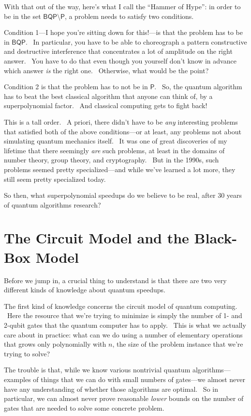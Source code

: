 \documentclass[12pt]{article}
\begin{document}
With that out of the way, here's what I call the ``Hammer of Hype'': in order to be in the set $\mathsf{BQP}\setminus \mathsf{P}$, a problem needs to satisfy two conditions.

Condition 1---I hope you're sitting down for this!---is that the problem has to be in $\mathsf{BQP}$. \ In particular, you have to be able to choreograph a pattern constructive and destructive interference that concentrates a lot of amplitude on the right answer. \ You have to do that even though you yourself don't know in advance which answer \emph{is} the right one. \ Otherwise, what would be the point?

Condition 2 is that the problem has to not be in $\mathsf{P}$. \ So, the quantum algorithm has to beat the best classical algorithm that anyone can think of, by a superpolynomial factor. \ And classical computing gets to fight back!

This is a tall order. \ A priori, there didn't have to be \emph{any} interesting problems that satisfied both of the above conditions---or at least, any problems not about simulating quantum mechanics itself. \ It was one of great discoveries of my lifetime that there seemingly \emph{are} such problems, at least in the domains of number theory, group theory, and cryptography. \ But in the 1990s, such problems seemed pretty specialized---and while we've learned a lot more, they still seem pretty specialized today.

So then, what superpolynomial speedups do we believe to be real, after 30 years of quantum algorithms research?


\section{The Circuit Model and the Black-Box Model}

Before we jump in, a crucial thing to understand is that there are two very different kinds of knowledge about quantum speedups.

The first kind of knowledge concerns the circuit model of quantum computing. \ Here the resource that we're trying to minimize is simply the number of 1- and 2-qubit gates that the quantum computer has to apply. \ This is what we actually care about in practice: what can we do using a number of elementary operations that grows only polynomially with $n$, the size of the problem instance that we're trying to solve?

The trouble is that, while we know various nontrivial quantum algorithms---examples of things that we can do with small numbers of gates---we almost never have any understanding of whether those algorithms are optimal. \ So in particular, we can almost never prove reasonable \emph{lower} bounds on the number of gates that are needed to solve some concrete problem.
\end{document}
